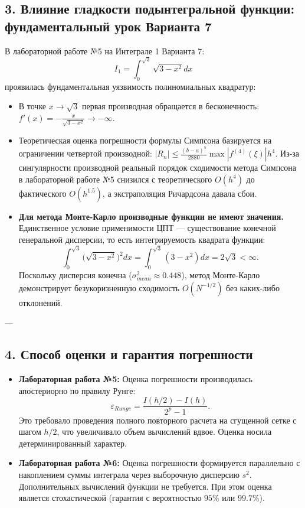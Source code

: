 \documentclass[11pt,a4paper]{article}
\begin{document}
\subsection{3. Влияние гладкости подынтегральной функции: фундаментальный урок Варианта 7}
В лабораторной работе №5 на Интеграле 1 Варианта 7:
\begin{equation}
    I_1 = \int_0^{\sqrt{3}} \sqrt{3 - x^2} dx
\end{equation}
проявилась фундаментальная уязвимость полиномиальных квадратур:
\begin{itemize}
    \item В точке $x \to \sqrt{3}$ первая производная обращается в бесконечность: $f'(x) = -\frac{x}{\sqrt{3-x^2}} \to -\infty$.
    \item Теоретическая оценка погрешности формулы Симпсона базируется на ограничении четвертой производной: $|R_n| \le \frac{(b-a)^5}{2880} \max |f^{(4)}(\xi)| h^4$. Из-за сингулярности производной реальный порядок сходимости метода Симпсона в лабораторной работе №5 снизился с теоретического $O(h^4)$ до фактического $O(h^{1.5})$, а экстраполяция Ричардсона давала сбои.
    \item \textbf{Для метода Монте-Карло производные функции не имеют значения.} Единственное условие применимости ЦПТ --- существование конечной генеральной дисперсии, то есть интегрируемость квадрата функции:
    $$\int_0^{\sqrt{3}} \big(\sqrt{3 - x^2}\big)^2 dx = \int_0^{\sqrt{3}} (3 - x^2) dx = 2\sqrt{3} < \infty.$$
    Поскольку дисперсия конечна ($\sigma^2_{mean} \approx 0.448$), метод Монте-Карло демонстрирует безукоризненную сходимость $O(N^{-1/2})$ без каких-либо отклонений.
\end{itemize}

---

\subsection{4. Способ оценки и гарантия погрешности}
\begin{itemize}
    \item \textbf{Лабораторная работа №5:} Оценка погрешности производилась апостериорно по правилу Рунге:
    $$\varepsilon_{Runge} = \frac{I(h/2) - I(h)}{2^p - 1}.$$
    Это требовало проведения полного повторного расчета на сгущенной сетке с шагом $h/2$, что увеличивало объем вычислений вдвое. Оценка носила детерминированный характер.
    \item \textbf{Лабораторная работа №6:} Оценка погрешности формируется параллельно с накоплением суммы интеграла через выборочную дисперсию $s^2$. Дополнительных вычислений функции не требуется. При этом оценка является стохастической (гарантия с вероятностью $95\%$ или $99.7\%$).
\end{itemize}
\end{document}
